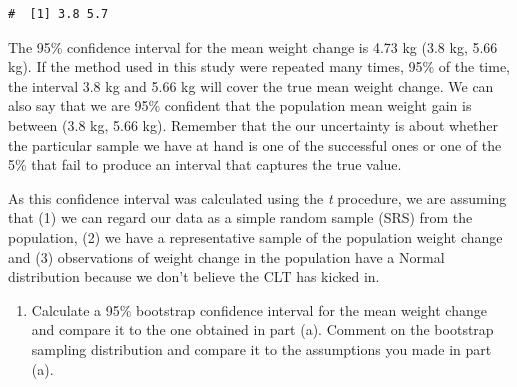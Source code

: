 \documentclass[letterpaper,11pt,twoside,]{pinp}
\providecommand{\tightlist}{%
  \setlength{\itemsep}{0pt}\setlength{\parskip}{0pt}}
\begin{document}
\begin{ShadedResult}
\begin{verbatim}
#  [1] 3.8 5.7
\end{verbatim}
\end{ShadedResult}

The 95\% confidence interval for the mean weight change is 4.73 kg (3.8
kg, 5.66 kg). If the method used in this study were repeated many times,
95\% of the time, the interval 3.8 kg and 5.66 kg will cover the true
mean weight change. We can also say that we are 95\% confident that the
population mean weight gain is between (3.8 kg, 5.66 kg). Remember that
the our uncertainty is about whether the particular sample we have at
hand is one of the successful ones or one of the 5\% that fail to
produce an interval that captures the true value.

As this confidence interval was calculated using the \emph{t} procedure,
we are assuming that (1) we can regard our data as a simple random
sample (SRS) from the population, (2) we have a representative sample of
the population weight change and (3) observations of weight change in
the population have a Normal distribution because we don't believe the
CLT has kicked in.

\begin{enumerate}
\def\labelenumi{\alph{enumi}.}
\setcounter{enumi}{1}
\tightlist
\item
  Calculate a 95\% bootstrap confidence interval for the mean weight
  change and compare it to the one obtained in part (a). Comment on the
  bootstrap sampling distribution and compare it to the assumptions you
  made in part (a).
\end{enumerate}

\begin{Shaded}
\begin{Highlighting}[]
\OtherTok{\textless{}{-}} \NormalTok{(}\NormalTok{, }\NormalTok{ \{}
\SpecialCharTok{::} \NormalTok{) }\SpecialCharTok{\%\textgreater{}\%}
\SpecialCharTok{::}\NormalTok{(} \SpecialCharTok{\%\textgreater{}\%}
\SpecialCharTok{::}
\NormalTok{\})}
 \NormalTok{, } \NormalTok{)}
\end{Highlighting}
\end{Shaded}
\end{document}

